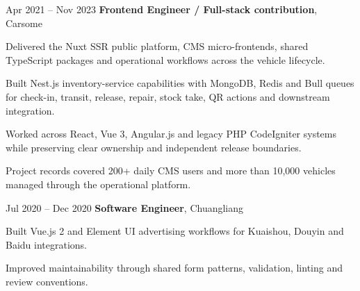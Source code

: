 \documentclass[10pt, letterpaper]{article}
\begin{document}
        \vspace{0.25 cm}
        \begin{twocolentry}{Apr 2021 -- Nov 2023}
            \textbf{Frontend Engineer / Full-stack contribution}, Carsome
        \end{twocolentry}
        \begin{onecolentry}
            \begin{highlights}
                \item Delivered the Nuxt SSR public platform, CMS micro-frontends, shared TypeScript packages and operational workflows across the vehicle lifecycle.
                \item Built Nest.js inventory-service capabilities with MongoDB, Redis and Bull queues for check-in, transit, release, repair, stock take, QR actions and downstream integration.
                \item Worked across React, Vue 3, Angular.js and legacy PHP CodeIgniter systems while preserving clear ownership and independent release boundaries.
                \item Project records covered 200+ daily CMS users and more than 10,000 vehicles managed through the operational platform.
            \end{highlights}
        \end{onecolentry}

        \vspace{0.25 cm}
        \begin{twocolentry}{Jul 2020 -- Dec 2020}
            \textbf{Software Engineer}, Chuangliang
        \end{twocolentry}
        \begin{onecolentry}
            \begin{highlights}
                \item Built Vue.js 2 and Element UI advertising workflows for Kuaishou, Douyin and Baidu integrations.
                \item Improved maintainability through shared form patterns, validation, linting and review conventions.
            \end{highlights}
        \end{onecolentry}
\end{document}
